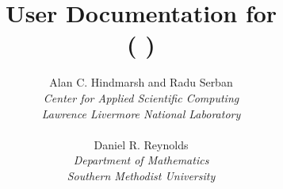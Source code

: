 \documentclass[twoside,openright,10pt]{report}
\title{User Documentation for {\cvode} {\cvrelease} \\
           ({\sundials} {\sunrelease})}
\author{
  Alan C. Hindmarsh and Radu Serban\\
  {\em Center for Applied Scientific Computing} \\
  {\em Lawrence Livermore National Laboratory} \\
  \\
  Daniel R. Reynolds\\
  {\em Department of Mathematics} \\
  {\em Southern Methodist University}
}
\date{
  \today
  \vfill
  {\centerline{\texttt{[image: doc\_logo\_blue]}}}
  \vfill \cvucrlug
}
\begin{document}
\frontug
\renewcommand{\chaptermark}[1]{\markboth{#1}{}}
\renewcommand{\sectionmark}[1]{\markright{\thesection\ #1}}


\clearemptydoublepage

\clearemptydoublepage

\clearemptydoublepage

\clearemptydoublepage

\clearemptydoublepage

\clearemptydoublepage

\clearemptydoublepage

\clearemptydoublepage

\clearemptydoublepage
\appendix

\clearemptydoublepage

\clearemptydoublepage


\clearemptydoublepage
\printindex
\clearemptydoublepage
\end{document}
